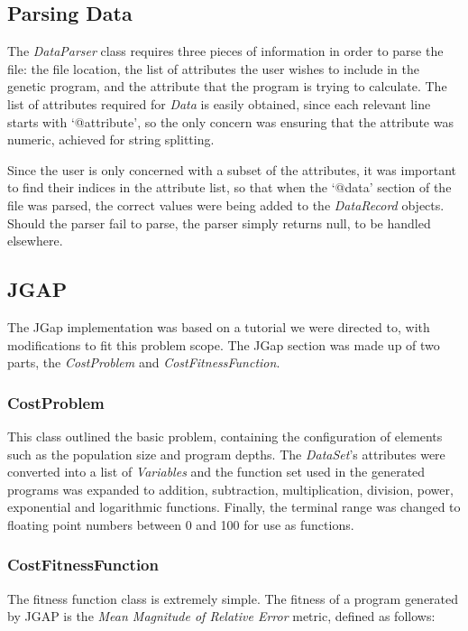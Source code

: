 \documentclass[11pt, a4paper]{article}
\begin{document}
\subsection{Parsing Data} %
\label{sub:parsing_data}
The \emph{DataParser} class requires three pieces of information in order to
parse the file: the file location, the list of attributes the user wishes to
include in the genetic program, and the attribute that the program is trying to
calculate. The list of attributes required for \emph{Data} is easily obtained,
since each relevant line starts with `@attribute', so the only concern was
ensuring that the attribute was numeric, achieved for string splitting.

Since the user is only concerned with a subset of the attributes, it was
important to find their indices in the attribute list, so that when the `@data'
section of the file was parsed, the correct values were being added to the
\emph{DataRecord} objects. Should the parser fail to parse, the parser simply
returns null, to be handled elsewhere.

\subsection{JGAP} %
\label{sub:jgap}
The JGap implementation was based on a tutorial \cite{JGapTutorial} we were
directed to, with modifications to fit this problem scope. The JGap section was
made up of two parts, the \emph{CostProblem} and \emph{CostFitnessFunction}.

\subsubsection{CostProblem} %
\label{ssub:costproblem}
This class outlined the basic problem, containing the configuration of elements
such as the population size and program depths. The \emph{DataSet}'s attributes
were converted into a list of \emph{Variables} and the function set used in the
generated programs was expanded to addition, subtraction, multiplication,
division, power, exponential and logarithmic functions. Finally, the terminal
range was changed to floating point numbers between 0 and 100 for use as
functions.

\subsubsection{CostFitnessFunction} %
\label{ssub:costfitnessfunction}
The fitness function class is extremely simple. The fitness of a program
generated by JGAP is the \emph{Mean Magnitude of Relative Error} metric, defined
as follows:
\end{document}
